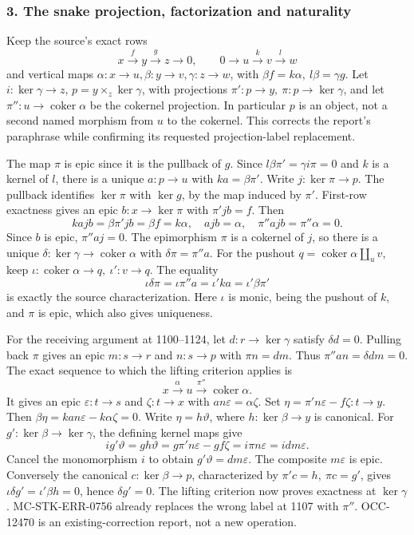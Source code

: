 \subsubsection{3. The snake projection, factorization and naturality}\label{the-snake-projection-factorization-and-naturality}

Keep the source's exact rows \[
x\xrightarrow f y\xrightarrow g z\to0,\qquad
0\to u\xrightarrow k v\xrightarrow l w
\] and vertical maps \(\alpha:x\to u,\beta:y\to v,\gamma:z\to w\), with \(\beta f=k\alpha,\ l\beta=\gamma g\). Let \(i:\ker\gamma\to z\), \(p=y\times_z\ker\gamma\), with projections \(\pi':p\to y,\ \pi:p\to\ker\gamma\), and let \(\pi'':u\to\operatorname{coker}\alpha\) be the cokernel projection. In particular \(p\) is an object, not a second named morphism from \(u\) to the cokernel. This corrects the report's paraphrase while confirming its requested projection-label replacement.

The map \(\pi\) is epic since it is the pullback of \(g\). Since \(l\beta\pi'=\gamma i\pi=0\) and \(k\) is a kernel of \(l\), there is a unique \(a:p\to u\) with \(ka=\beta\pi'\). Write \(j:\ker\pi\to p\). The pullback identifies \(\ker\pi\) with \(\ker g\), by the map induced by \(\pi'\). First-row exactness gives an epic \(b:x\to\ker\pi\) with \(\pi'jb=f\). Then \[
kajb=\beta\pi'jb=\beta f=k\alpha,\quad
ajb=\alpha,\quad \pi''ajb=\pi''\alpha=0.
\] Since \(b\) is epic, \(\pi''aj=0\). The epimorphism \(\pi\) is a cokernel of \(j\), so there is a unique \(\delta:\ker\gamma\to\operatorname{coker}\alpha\) with \(\delta\pi=\pi''a\). For the pushout \(q=\operatorname{coker}\alpha\amalg_u v\), keep \(\iota:\operatorname{coker}\alpha\to q,\ \iota':v\to q\). The equality \[
\iota\delta\pi=\iota\pi''a=\iota'ka=\iota'\beta\pi'
\] is exactly the source characterization. Here \(\iota\) is monic, being the pushout of \(k\), and \(\pi\) is epic, which also gives uniqueness.

For the receiving argument at 1100--1124, let \(d:r\to\ker\gamma\) satisfy \(\delta d=0\). Pulling back \(\pi\) gives an epic \(m:s\to r\) and \(n:s\to p\) with \(\pi n=dm\). Thus \(\pi''an=\delta dm=0\). The exact sequence to which the lifting criterion applies is \[
x\xrightarrow{\alpha}u\xrightarrow{\pi''}\operatorname{coker}\alpha.
\] It gives an epic \(\varepsilon:t\to s\) and \(\zeta:t\to x\) with \(an\varepsilon=\alpha\zeta\). Set \(\eta=\pi'n\varepsilon-f\zeta:t\to y\). Then \(\beta\eta=kan\varepsilon-k\alpha\zeta=0\). Write \(\eta=h\vartheta\), where \(h:\ker\beta\to y\) is canonical. For \(g':\ker\beta\to\ker\gamma\), the defining kernel maps give \[
ig'\vartheta=gh\vartheta
=g\pi'n\varepsilon-gf\zeta
=i\pi n\varepsilon=idm\varepsilon.
\] Cancel the monomorphism \(i\) to obtain \(g'\vartheta=dm\varepsilon\). The composite \(m\varepsilon\) is epic. Conversely the canonical \(c:\ker\beta\to p\), characterized by \(\pi'c=h,\ \pi c=g'\), gives \(\iota\delta g'=\iota'\beta h=0\), hence \(\delta g'=0\). The lifting criterion now proves exactness at \(\ker\gamma\). MC-STK-ERR-0756 already replaces the wrong label at 1107 with \(\pi''\). OCC-12470 is an existing-correction report, not a new operation.

